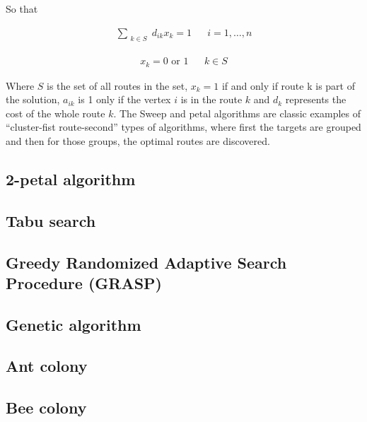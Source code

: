 \noindent
So that

\begin{equation}
\begin{aligned}
\label{eq:petal2}
\displaystyle\sum_{\substack{k \in S}} d_{ik}x_k = 1 && i = 1, \ldots, n
\end{aligned}
\end{equation}

\begin{equation}
\begin{aligned}
\label{eq:petal3}
x_{k} = 0 \text{ or } 1 && k \in S
\end{aligned}
\end{equation}

Where $S$ is the set of all routes in the set, $x_k = 1$ if and only if route k is part of the solution, $a_{ik}$ is 1 only if the vertex $i$ is in the route $k$ and $d_k$ represents the cost of the whole route $k$. \cite{laporte2000classical} The Sweep and petal algorithms are classic examples of ``cluster-fist route-second'' types of algorithms, where first the targets are grouped and then for those groups, the optimal routes are discovered. 

\subsection{2-petal algorithm}

\subsection{Tabu search}

\subsection{Greedy Randomized Adaptive Search Procedure (GRASP)}

\subsection{Genetic algorithm}

\subsection{Ant colony}

\subsection{Bee colony}